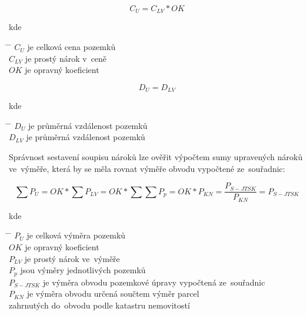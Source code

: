 \begin{equation}
	C_{U} = C_{LV}*OK
\end{equation}

kde
\begin{tabbing}
\hspace{2em} \= \hspace{5em} \= \kill
	\> $C_{U}$	\> je celková cena pozemků \\
	\> $C_{LV}$	\> je prostý nárok v~ceně \\
	\> $OK$		\> je opravný koeficient
\end{tabbing}

\begin{equation}
	D_{U} = D_{LV}
\end{equation}

kde
\begin{tabbing}
\hspace{2em} \= \hspace{5em} \= \kill
	\> $D_{U}$	\> je průměrná vzdálenost pozemků \\
	\> $D_{LV}$	\> je průměrná vzdálenost pozemků
\end{tabbing}

Správnost sestavení soupisu nároků lze ověřit výpočtem sumy upravených nároků ve~výměře, která by se měla rovnat výměře obvodu  vypočtené ze~souřadnic:

\begin{equation}
	\sum\nolimits P_{U} = OK*\sum\nolimits P_{LV} = OK * \sum\nolimits \sum\nolimits P_{p} = OK*P_{KN} = \frac{P_{S-JTSK}}{P_{KN}} = P_{S-JTSK}
\end{equation}

kde
\begin{tabbing}
\hspace{2em} \= \hspace{5em} \= \kill
	\> $P_{U}$		\> je celková výměra pozemků \\
	\> $OK$			\> je opravný koeficient \\
	\> $P_{LV}$		\> je prostý nárok ve~výměře \\
	\> $P_{p}$		\> jsou výměry jednotlivých pozemků \\
	\> $P_{S-JTSK}$	\> je výměra obvodu pozemkové úpravy vypočtená ze~souřadnic \\
	\> $P_{KN}$		\> je výměra obvodu určená součtem výměr parcel \\
	\> 				\> zahrnutých do~obvodu podle katastru nemovitostí	
\end{tabbing}

